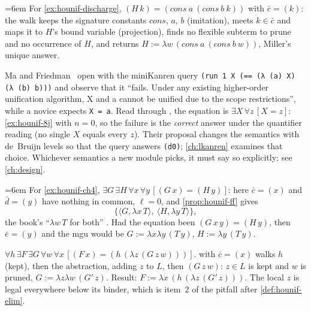 \begin{example}
\emergencystretch=6em
For \cref{ex:hounif-discharge}, $(H\,k)=(\mathit{cons}\ a\ (\mathit{cons}\ b\ k))$ with $\bar c=(k)$: the walk keeps the
signature constants $\mathit{cons}$, $a$, $b$ (imitation), meets $k\in\bar c$ and maps it to $H$'s bound variable
(projection), finds no flexible subterm to prune and no occurrence of $H$, and returns
$H:=\lambda w\,(\mathit{cons}\ a\ (\mathit{cons}\ b\ w))$, Miller's unique answer.
\end{example}

\begin{kanren}
Ma and Friedman~\cite{MaFriedman2021} open with the miniKanren query
\texttt{(run 1 X (== (λ (a) X) (λ (b) b)))} and observe that it \enquote{fails. Under any existing higher-order
unification algorithm, X and a cannot be unified due to the scope restrictions}, while a novice expects
\texttt{X = a}. Read through , the equation is $\exists X\,\forall z\,[X=z]$: \cref{ex:hounif-8j}
with $n=0$, so the failure is the \emph{correct} answer under the quantifier reading (no single $X$ equals every
$z$). Their proposal changes the semantics with de~Bruijn levels so that the query answers \texttt{(d0)};
\cref{ch:lkanren} examines that choice. Whichever semantics a new module picks, it must say so explicitly;
see \cref{ch:design}.
\end{kanren}

\begin{example}\label{ex:hounif-ffdiff}
\emergencystretch=6em
For \cref{ex:hounif-ch4}, $\exists G\,\exists H\,\forall x\,\forall y\,[(G\,x)=(H\,y)]$: here $\bar c=(x)$ and
$\bar d=(y)$ have nothing in common, $\ell=0$, and \cref{prop:hounif-ff} gives
\[\{\langle G,\lambda x\,T\rangle,\ \langle H,\lambda y\,T\rangle\},\]
the book's \enquote{$\lambda w\,T$ for both} . Had the
equation been $(G\,x\,y)=(H\,y)$, then $\bar e=(y)$ and the mgu would be $G:=\lambda x\lambda y\,(T\,y)$,
$H:=\lambda y\,(T\,y)$.
\end{example}

\begin{example}\label{ex:hounif-loc}
$\forall h\,\exists F\,\exists G\,\forall w\,\forall x\,[(F\,x)=(h\,(\lambda z\,(G\,z\,w)))]$.  with $\bar c=(x)$
walks $h$ (kept), then the abstraction, adding $z$ to $L$, then $(G\,z\,w)$: $z\in L$ is kept and $w$ is pruned,
$G:=\lambda z\lambda w\,(G'\,z)$. Result: $F:=\lambda x\,(h\,(\lambda z\,(G'\,z)))$. The local $z$ is legal everywhere below its
binder, which is item~2 of the pitfall after \cref{def:hounif-elim}.
\end{example}

